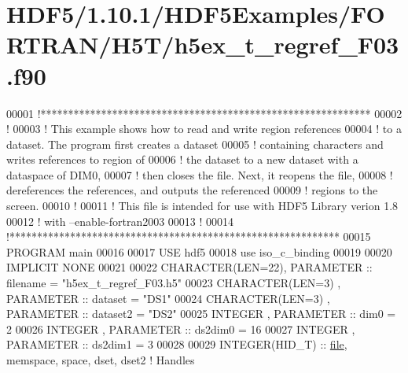 \hypertarget{_h_d_f5_21_810_81_2_h_d_f5_examples_2_f_o_r_t_r_a_n_2_h5_t_2h5ex__t__regref___f03_8f90_source}{}\section{H\+D\+F5/1.10.1/\+H\+D\+F5\+Examples/\+F\+O\+R\+T\+R\+A\+N/\+H5\+T/h5ex\+\_\+t\+\_\+regref\+\_\+\+F03.f90}
\label{_h_d_f5_21_810_81_2_h_d_f5_examples_2_f_o_r_t_r_a_n_2_h5_t_2h5ex__t__regref___f03_8f90_source}

\begin{DoxyCode}
00001 \textcolor{comment}{!************************************************************}
00002 \textcolor{comment}{!}
00003 \textcolor{comment}{!  This example shows how to read and write region references}
00004 \textcolor{comment}{!  to a dataset.  The program first creates a dataset}
00005 \textcolor{comment}{!  containing characters and writes references to region of}
00006 \textcolor{comment}{!  the dataset to a new dataset with a dataspace of DIM0,}
00007 \textcolor{comment}{!  then closes the file.  Next, it reopens the file,}
00008 \textcolor{comment}{!  dereferences the references, and outputs the referenced}
00009 \textcolor{comment}{!  regions to the screen.}
00010 \textcolor{comment}{!}
00011 \textcolor{comment}{!  This file is intended for use with HDF5 Library verion 1.8}
00012 \textcolor{comment}{!  with --enable-fortran2003 }
00013 \textcolor{comment}{!}
00014 \textcolor{comment}{!************************************************************}
00015 \textcolor{keyword}{PROGRAM} main
00016 
00017   \textcolor{keywordtype}{USE }hdf5
00018   \textcolor{keywordtype}{use }iso\_c\_binding
00019 
00020   \textcolor{keywordtype}{IMPLICIT NONE}
00021 
00022   \textcolor{keywordtype}{CHARACTER(LEN=22)}, \textcolor{keywordtype}{PARAMETER} :: filename  = \textcolor{stringliteral}{"h5ex\_t\_regref\_F03.h5"}
00023   \textcolor{keywordtype}{CHARACTER(LEN=3)} , \textcolor{keywordtype}{PARAMETER} :: dataset   = \textcolor{stringliteral}{"DS1"}
00024   \textcolor{keywordtype}{CHARACTER(LEN=3)} , \textcolor{keywordtype}{PARAMETER} :: dataset2  = \textcolor{stringliteral}{"DS2"}
00025   \textcolor{keywordtype}{INTEGER}          , \textcolor{keywordtype}{PARAMETER} :: dim0      = 2
00026   \textcolor{keywordtype}{INTEGER}          , \textcolor{keywordtype}{PARAMETER} :: ds2dim0   = 16
00027   \textcolor{keywordtype}{INTEGER}          , \textcolor{keywordtype}{PARAMETER} :: ds2dim1   = 3
00028 
00029   \textcolor{keywordtype}{INTEGER(HID\_T)}  :: \hyperlink{structfile}{file}, memspace, space, dset, dset2 \textcolor{comment}{! Handles}

\end{DoxyCode}
